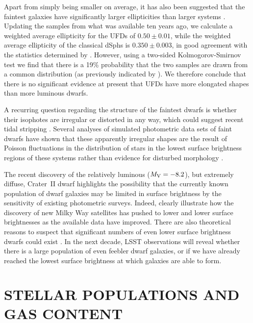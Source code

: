 \documentclass[a4paper]{ar-1col}
\begin{document}
Apart from simply being smaller on average, it has also been suggested
that the faintest galaxies have significantly larger ellipticities
than larger systems \citep{martin08}.  Updating the samples from what
was available ten years ago, we calculate a weighted average
ellipticity for the UFDs of $0.50 \pm 0.01$, while the weighted
average ellipticity of the classical dSphs is $0.350 \pm 0.003$, in
good agreement with the statistics determined by \citet{martin08}.
However, using a two-sided Kolmogorov-Smirnov test we find that there
is a 19\% probability that the two samples are drawn from a common
distribution (as previously indicated by \citealt{sand12}).  We
therefore conclude that there is no significant evidence at present
that UFDs have more elongated shapes than more luminous dwarfs.

A recurring question regarding the structure of the faintest dwarfs is
whether their isophotes are irregular or distorted in any way, which
could suggest recent tidal stripping
\citep[e.g.,][]{zucker06b,belokurov06,okamoto12}.  Several analyses of
simulated photometric data sets of faint dwarfs have shown that these
apparently irregular shapes are the result of Poisson fluctuations in
the distribution of stars in the lowest surface brightness regions of
these systems rather than evidence for disturbed morphology
\citep{walsh08,martin08,munoz10}.

The recent discovery of the relatively luminous ($M_{{\rm V}} =
-8.2$), but extremely diffuse, Crater~II dwarf \citep{torrealba16}
highlights the possibility that the currently known population of
dwarf galaxies may be limited in surface brightness by the sensitivity
of existing photometric surveys.  Indeed, \citet{munoz18b} clearly
illustrate how the discovery of new Milky Way satellites has pushed to
lower and lower surface brightnesses as the available data have
improved.  There are also theoretical reasons to suspect that
significant numbers of even lower surface brightness dwarfs could
exist \citep[e.g.,][]{bullock10}.  In the next decade, LSST
observations will reveal whether there is a large population of even
feebler dwarf galaxies, or if we have already reached the lowest
surface brightness at which galaxies are able to form.



\section{STELLAR POPULATIONS AND GAS CONTENT}
\label{sec:stellar_pops}
\end{document}
